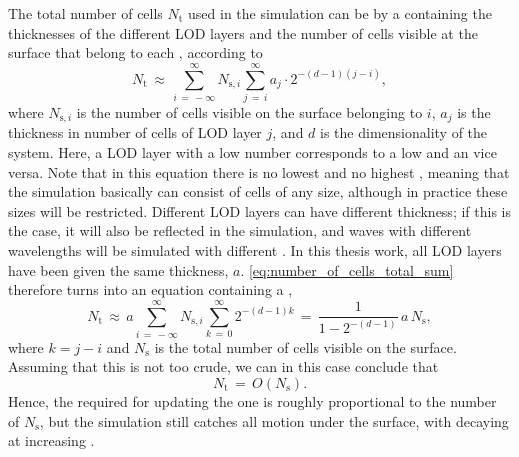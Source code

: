 The total number of cells $N_{\text{t}}$ used in the simulation can be \approximated by a  containing the thicknesses of the different LOD layers and the number of cells visible at the surface that belong to each \LOD, according to
%
\begin{equation} \label{eq:number_of_cells_total_sum}
N_{\text{t}} \,\approx\, \sum_{i\,=\,-\infty}^\infty N_{\text{s},i}\sum_{j\,=\,i}^\infty a_j\cdot 2^{-(d-1)(j-i)},
\end{equation}
%
where $N_{\text{s},i}$ is the number of cells visible on the surface belonging to  $i$, $a_j$ is the thickness in number of cells of LOD layer $j$, and $d$ is the dimensionality of the system. Here, a LOD layer with a low number corresponds to a low \LOD and an vice versa. Note that in this equation there is no lowest \LOD and no highest \LOD, meaning that the simulation basically can consist of cells of any size, although in practice these sizes will be restricted. Different LOD layers can have different thickness; if this is the case, it will also be reflected in the simulation, and waves with different wavelengths will be simulated with different \accuracy. In this thesis work, all LOD layers have been given the same thickness, $a$. \eqref{eq:number_of_cells_total_sum} therefore turns into an equation containing a ,
%
\begin{equation} \label{eq:number_of_cells_total}
N_{\text{t}} \,\approx\, a\sum_{i\,=\,-\infty}^\infty N_{\text{s},i}\sum_{k\,=\,0}^\infty 2^{-(d-1)k} \,=\, \frac{1}{1-2^{-(d-1)}}\,a\,N_{\text{s}},
\end{equation}
%
where $k = j-i$ and $N_{\text{s}}$ is the total number of cells visible on the surface. Assuming that this \approximation is not too crude, we can in this case conclude that
%
\begin{equation} \label{eq:number_of_cells_total_ordo}
N_{\text{t}} \,=\, O(N_{\text{s}}).
\end{equation}
%
%
Hence, the  required for updating the  one  is roughly proportional to the number of  $N_{\text{s}}$, but the simulation still catches all motion under the surface, with decaying \accuracy at increasing .





